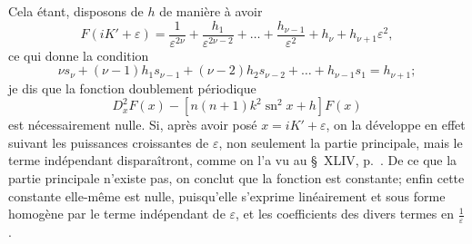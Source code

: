 \documentclass[11pt,leqno,oneside,letterpaper]{book}[2005/09/16]
\DeclareMathOperator{\sn}{sn}
\begin{document}
Cela \'etant, disposons de $h$ de mani\`ere \`a avoir
\[
F(iK' + \varepsilon) = \frac{1}        {\varepsilon^{2\nu}}
                     + \frac{h_1}      {\varepsilon^{2\nu-2}} + \ldots
                     + \frac{h_{\nu-1}}{\varepsilon^{2}} + h_{\nu}
                     + h_{\nu+1} \varepsilon^2,
\]
ce qui donne la condition
\[
\nu s_{\nu} + (\nu-1)h_1 s_{\nu-1} + (\nu-2)h_2 s_{\nu-2} + \ldots + h_{\nu-1} s_1 = h_{\nu+1};
\]
je dis que la fonction doublement p\'eriodique
\[
D_x^2 F(x) - \left[n(n+1)k^2 \sn^2 x + h\right] F(x)
\]
est n\'ecessairement nulle. Si, apr\`es avoir pos\'e $x=iK'+\varepsilon$, on la d\'eveloppe
en effet suivant les puissances croissantes de $\varepsilon$, non seulement la partie
principale, mais le terme ind\'ependant dispara\^itront, comme on l'a vu au
\S~XLIV, p.~\pageref{page121}. De ce que la partie principale n'existe pas, on conclut
que la fonction est constante; enfin cette constante elle-m\^eme est nulle,
puisqu'elle s'exprime lin\'eairement et sous forme homog\`ene par le terme
ind\'ependant de $\varepsilon$, et les coefficients des divers termes en $\frac{1}{\varepsilon}$.
\end{document}
